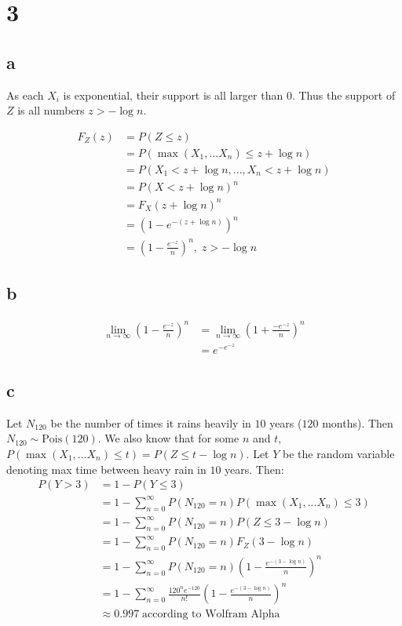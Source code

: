 \documentclass[10pt]{article}
\begin{document}
\section*{3}
\subsection*{a}
As each $X_i$ is exponential, their support is all larger than $0$. Thus the support of $Z$ is all numbers $z > -\log n.$

\begin{align*}
    F_Z(z) &= P(Z\le z)\\
    &= P( \max(X_1,...X_n)\le z+\log n)\\
    &= P(X_1 < z+\log n, ...,X_n<z+\log n)\\
    &= P(X<z+\log n)^n\\
    &= F_X(z+\log n)^n\\
    &= (1- e^{-(z+\log n)})^n\\
    &= \left (1- \frac{e^{-z}}{n}\right )^n,\; z>-\log n
\end{align*}

\subsection*{b}


\begin{align*}
    \lim_{n\to\infty}\left(1- \frac{e^{-z}}{n}\right )^n &=  \lim_{n\to\infty}\left(1+ \frac{-e^{-z}}{n}\right )^n\\
    &= e^{-e^{-z}}
\end{align*}

\subsection*{c}
Let $N_{120}$ be the number of times it rains heavily in $10$ years ($120$ months). Then $N_{120}\sim\text{Pois}(120).$ We also know that for some $n$ and $t$, $P(\max(X_1,...X_n)\le t)= P(Z\le t -\log n).$ Let $Y$ be the random variable denoting max time between heavy rain in $10$ years. Then:
\begin{align*}
    P(Y >3) &= 1 - P(Y \le3)\\
    &= 1 - \sum_{n=0}^\infty P(N_{120}=n)P(\max(X_1,...X_n)\le 3)\\
    &= 1 - \sum_{n=0}^\infty P(N_{120}=n)P(Z\le 3 -\log n)\\
    &= 1 - \sum_{n=0}^\infty P(N_{120}=n)F_Z(3-\log n)\\
    &= 1 - \sum_{n=0}^\infty P(N_{120}=n)\left (1- \frac{e^{-(3-\log n)}}{n}\right )^n\\
    &= 1 - \sum_{n=0}^\infty \frac{120^ne^{-120}}{n!}\left (1- \frac{e^{-(3-\log n)}}{n}\right )^n\\
    &\approx 0.997\;\text{according to Wolfram Alpha}
\end{align*}
\end{document}
